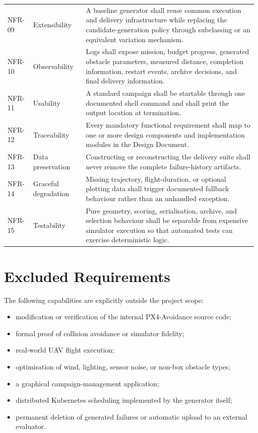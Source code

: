 \documentclass[11pt,a4paper,openany]{report}
\begin{document}
\begin{longtable}{L{1.7cm} L{3.0cm} L{9.9cm}}
NFR-09 & Extensibility & A baseline generator shall reuse common execution and delivery infrastructure while replacing the candidate-generation policy through subclassing or an equivalent variation mechanism.\\
NFR-10 & Observability & Logs shall expose mission, budget progress, generated obstacle parameters, measured distance, completion information, restart events, archive decisions, and final delivery information.\\
NFR-11 & Usability & A standard campaign shall be startable through one documented shell command and shall print the output location at termination.\\
NFR-12 & Traceability & Every mandatory functional requirement shall map to one or more design components and implementation modules in the Design Document.\\
NFR-13 & Data preservation & Constructing or reconstructing the delivery suite shall never remove the complete failure-history artifacts.\\
NFR-14 & Graceful degradation & Missing trajectory, flight-duration, or optional plotting data shall trigger documented fallback behaviour rather than an unhandled exception.\\
NFR-15 & Testability & Pure geometry, scoring, serialisation, archive, and selection behaviour shall be separable from expensive simulator execution so that automated tests can exercise deterministic logic.\\
\bottomrule
\end{longtable}

\section{Excluded Requirements}
The following capabilities are explicitly outside the project scope:
\begin{itemize}
  \item modification or verification of the internal PX4-Avoidance source code;
  \item formal proof of collision avoidance or simulator fidelity;
  \item real-world UAV flight execution;
  \item optimisation of wind, lighting, sensor noise, or non-box obstacle types;
  \item a graphical campaign-management application;
  \item distributed Kubernetes scheduling implemented by the generator itself;
  \item permanent deletion of generated failures or automatic upload to an external evaluator.
\end{itemize}
\end{document}
